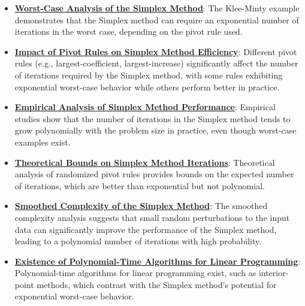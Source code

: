 \documentclass{article}%
\begin{document}
\begin{itemize}[leftmargin=*]%
\item \href{https://www.math.purdue.edu/~yipn/421//2024-09-05-SimplexEfficiency.pdf#page=2}{\textbf{Worst{-}Case Analysis of the Simplex Method}}: The Klee-Minty example demonstrates that the Simplex method can require an exponential number of iterations in the worst case, depending on the pivot rule used.%
\item \href{https://www.math.purdue.edu/~yipn/421//2024-09-05-SimplexEfficiency.pdf#page=3}{\textbf{Impact of Pivot Rules on Simplex Method Efficiency}}: Different pivot rules (e.g., largest-coefficient, largest-increase) significantly affect the number of iterations required by the Simplex method, with some rules exhibiting exponential worst-case behavior while others perform better in practice.%
\item \href{https://www.math.purdue.edu/~yipn/421//2024-09-05-SimplexEfficiency.pdf#page=9}{\textbf{Empirical Analysis of Simplex Method Performance}}: Empirical studies show that the number of iterations in the Simplex method tends to grow polynomially with the problem size in practice, even though worst-case examples exist.%
\item \href{https://www.math.purdue.edu/~yipn/421//2024-09-05-SimplexEfficiency.pdf#page=10}{\textbf{Theoretical Bounds on Simplex Method Iterations}}: Theoretical analysis of randomized pivot rules provides bounds on the expected number of iterations, which are better than exponential but not polynomial.%
\item \href{https://www.math.purdue.edu/~yipn/421//2024-09-05-SimplexEfficiency.pdf#page=11}{\textbf{Smoothed Complexity of the Simplex Method}}: The smoothed complexity analysis suggests that small random perturbations to the input data can significantly improve the performance of the Simplex method, leading to a polynomial number of iterations with high probability.%
\item \href{https://www.math.purdue.edu/~yipn/421//2024-09-05-SimplexEfficiency.pdf#page=12}{\textbf{Existence of Polynomial{-}Time Algorithms for Linear Programming}}: Polynomial-time algorithms for linear programming exist, such as interior-point methods, which contrast with the Simplex method's potential for exponential worst-case behavior.%
\end{itemize}%
\end{document}
